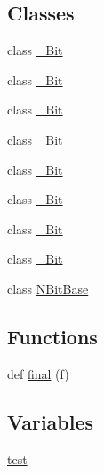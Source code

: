 \subsection*{Classes}
\begin{DoxyCompactItemize}
\item 
class \hyperlink{classnumpy_1_1typing_1_1__128Bit}{\+\_\+Bit}
\item 
class \hyperlink{classnumpy_1_1typing_1_1__16Bit}{\+\_\+Bit}
\item 
class \hyperlink{classnumpy_1_1typing_1_1__256Bit}{\+\_\+Bit}
\item 
class \hyperlink{classnumpy_1_1typing_1_1__32Bit}{\+\_\+Bit}
\item 
class \hyperlink{classnumpy_1_1typing_1_1__64Bit}{\+\_\+Bit}
\item 
class \hyperlink{classnumpy_1_1typing_1_1__80Bit}{\+\_\+Bit}
\item 
class \hyperlink{classnumpy_1_1typing_1_1__8Bit}{\+\_\+Bit}
\item 
class \hyperlink{classnumpy_1_1typing_1_1__96Bit}{\+\_\+Bit}
\item 
class \hyperlink{classnumpy_1_1typing_1_1NBitBase}{N\+Bit\+Base}
\end{DoxyCompactItemize}
\subsection*{Functions}
\begin{DoxyCompactItemize}
\item 
def \hyperlink{namespacenumpy_1_1typing_ae5318a3c44e5bcc959a32b1436f7d65a}{final} (f)
\end{DoxyCompactItemize}
\subsection*{Variables}
\begin{DoxyCompactItemize}
\item 
\hyperlink{namespacenumpy_1_1typing_ae85ceb6b665f510f0a3010e781ac12c4}{test}
\end{DoxyCompactItemize}


